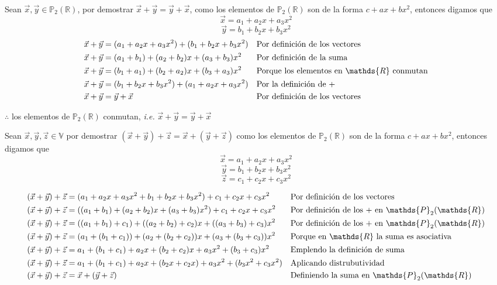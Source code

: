 \documentclass[letterpaper]{article}
\newcommand{\V}{\mathds{V}}
\newcommand{\R}{\mathds{R}}
\newcommand{\Po}{\mathds{P}_2(\mathds{R})}
\renewcommand{\*}{\cdot}
\theoremstyle{definition}
\begin{document}
Sean $ \vec{x}, \vec{y} \in \Po $, por demostrar $\vec{x} + \vec{y} = \vec{y} + \vec{x}  $, como los elementos de $ \Po $ son de la forma $ c + ax + bx^2$, entonces digamos que \[ \vec{x} = a_1 + a_2x + a_3x^2 \] \[ \vec{y} = b_1 + b_2x + b_3x^2 \]
\begin{align*}
	\vec{x} + \vec{y} &=  (a_1 + a_2x + a_3x^2) + (b_1 + b_2x + b_3x^2) && \text{Por definición de los vectores}\\
	\vec{x} + \vec{y} &=  (a_1 + b_1) + (a_2 + b_2)x + (a_3 + b_3)x^2&& \text{Por definición de la suma}\\
	\vec{x} + \vec{y} &=  (b_1 + a_1) + (b_2 + a_2)x + (b_3 + a_3)x^2&& \text{Porque los elementos en $ \R $ conmutan}\\
	\vec{x} + \vec{y} &=  (b_1 + b_2x + b_3x^2) + (a_1 + a_2x + a_3x^2) && \text{Por la definición de +}\\
	\vec{x} + \vec{y} &=  \vec{y} + \vec{x}&& \text{Por definición de los vectores}\\
\end{align*}
\begin{center}
	$ \therefore $ los elementos de $ \Po $ conmutan, \textit{i.e.} $ \vec{x} + \vec{y} = 	\vec{y} + \vec{x} $
\end{center}

Sean $ \vec{x}, \vec{y}, \vec{z} \in \V $ por demostrar $  (\vec{x} + \vec{y}) + \vec{z} = \vec{x} + (\vec{y} + \vec{z})$
como los elementos de $ \Po $ son de la forma $ c + ax + bx^2$, entonces digamos que \[ \vec{x} = a_1 + a_2x + a_3x^2 \] \[ \vec{y} = b_1 + b_2x + b_3x^2 \] \[ \vec{z} = c_1 + c_2x + c_3x^2 \]

\begin{align*}
	(\vec{x} + \vec{y}) + \vec{z} &= ( a_1 + a_2x + a_3x^2 + b_1 + b_2x + b_3x^2) + c_1 + c_2x + c_3x^2&& \text{Por definición de los vectores}\\
	(\vec{x} + \vec{y}) + \vec{z} &= ( (a_1 + b_1)  + (a_2 + b_2)x + (a_3 + b_3) x^2 ) + c_1 + c_2x + c_3x^2&& \text{Por definición de los + en $ \Po $}\\ 
	(\vec{x} + \vec{y}) + \vec{z} &= ((a_1 + b_1) + c_1)  + ((a_2 + b_2) + c_2 )x + ((a_3 + b_3) + c_3) x^2 && \text{Por definición de los + en $ \Po $}\\ 
	(\vec{x} + \vec{y}) + \vec{z} &= (a_1 + (b_1 + c_1))  + (a_2 + (b_2 + c_2))x + (a_3 + (b_3 + c_3)) x^2 && \text{Porque en $ \R $ la suma es asociativa}\\ 
	(\vec{x} + \vec{y}) + \vec{z} &= a_1 + (b_1 + c_1)  + a_2x + (b_2 + c_2)x + a_3x^2 + (b_3 + c_3)x^2 && \text{Emplendo la definición de suma}\\ 
	(\vec{x} + \vec{y}) + \vec{z} &= a_1 + (b_1 + c_1)  + a_2x + (b_2x + c_2x) + a_3x^2 + (b_3x^2 + c_3x^2) && \text{Aplicando distrubutividad}\\ 
	(\vec{x} + \vec{y}) + \vec{z} &= \vec{x} + (\vec{y} + \vec{z}) && \text{Definiendo la suma en $ \Po $}\\ 
\end{align*}
\end{document}
